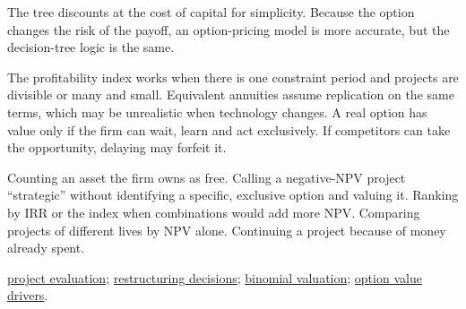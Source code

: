 \begin{qfmethod}
The tree discounts at the cost of capital for simplicity. Because the option changes the risk of the payoff, an option-pricing model is more accurate, but the decision-tree logic is the same.

 The profitability index works when there is one constraint period and projects are divisible or many and small. Equivalent annuities assume replication on the same terms, which may be unrealistic when technology changes. A real option has value only if the firm can wait, learn and act exclusively. If competitors can take the opportunity, delaying may forfeit it.

 Counting an asset the firm owns as free. Calling a negative-NPV project ``strategic'' without identifying a specific, exclusive option and valuing it. Ranking by IRR or the index when combinations would add more NPV. Comparing projects of different lives by NPV alone. Continuing a project because of money already spent.

 \hyperref[meth:capital-project-evaluation]{project evaluation}; \hyperref[meth:restructuring-evaluation]{restructuring decisions}; \hyperref[meth:one-period-binomial-valuation]{binomial valuation}; \hyperref[def:option-value-drivers]{option value drivers}.

\end{qfmethod}
